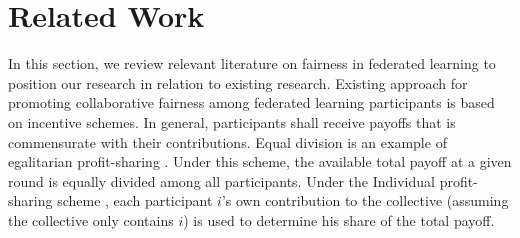 \documentclass{article}
\begin{document}





\section{Related Work}
\label{sec:Related_work}
In this section, we review relevant literature on fairness in federated learning to position our research in relation to existing research.
Existing approach for promoting collaborative fairness among federated learning participants is based on incentive schemes. In general, participants shall receive payoffs that is commensurate with their contributions. Equal division is an example of egalitarian profit-sharing \cite{Yang-et-al:2017IEEE}. Under this scheme, the available total payoff at a given round is equally divided among all participants. Under the Individual profit-sharing scheme \cite{Yang-et-al:2017IEEE}, each participant $i$'s own contribution to the collective (assuming the collective only contains $i$) is used to determine his share of the total payoff.
\end{document}
